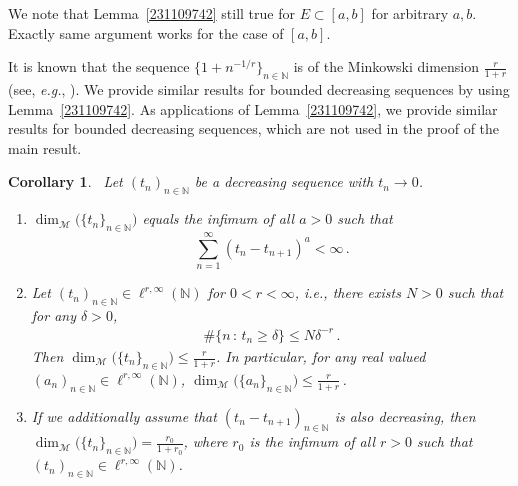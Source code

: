 \documentclass[11pt]{amsart}
\theoremstyle{plain}
\newtheorem{corollary}[theorem]{Corollary}
\theoremstyle{definition}
\theoremstyle{remark}
\numberwithin{equation}{section}
\newcommand{\cM}{\mathcal{M}}
\newcommand{\bN}{\mathbb{N}}
\begin{document}
We note that Lemma~\ref{231109742} still true for $E \subset [a,b]$ for arbitrary $a,b$.
Exactly same argument works for the case of $[a,b]$.

It is known that the sequence $\{1+n^{-1/r}\}_{n\in \bN}$ is of the Minkowski dimension $\frac{r}{1+r}$ (see, \textit{e.g.}, \cite[Examples]{SWW1995}).
We provide similar results for bounded decreasing sequences by using Lemma~\ref{231109742}.
As applications of Lemma~\ref{231109742}, we provide similar results for bounded decreasing sequences, which are not used in the proof of the main result.


\begin{corollary}\label{240704231}\,
Let $(t_n)_{n\in\bN}$ be a decreasing sequence with $t_n\rightarrow 0$.
\begin{enumerate}
    \item  $\dim_{\cM}\big(\{t_n\}_{n\in\bN}\big)$ equals the infimum of all $a>0$ such that
    $$
    \sum_{n=1}^\infty(t_n-t_{n+1})^a<\infty\,.
    $$

    \item Let $(t_n)_{n\in\bN}\in \ell^{r,\infty}(\bN)$ for $0<r<\infty$, \textit{i.e.}, there exists $N>0$ such that for any $\delta>0$, 
\begin{align}\label{240704226}
\#\{n\,:\,t_n\geq \delta\}\leq N\delta^{-r}\,.
\end{align}
Then $\dim_{\cM}\big(\{t_n\}_{n\in\bN}\big)\leq \frac{r}{1+r}$.
In particular, for any real valued $(a_n)_{n\in\bN}\in\ell^{r,\infty}(\bN)$, $\dim_{\cM}\big(\{a_n\}_{n\in\bN}\big)\leq \frac{r}{1+r}$\,.

    \item If we additionally assume that $(t_n-t_{n+1})_{n\in\bN}$ is also decreasing, then $\dim_{\cM}\big(\{t_n\}_{n\in\bN}\big)=\frac{r_0}{1+r_0}$, where $r_0$ is the infimum of all $r>0$ such that $(t_n)_{n\in\bN}\in \ell^{r,\infty}(\bN)$.
\end{enumerate}
\end{corollary}
\end{document}
